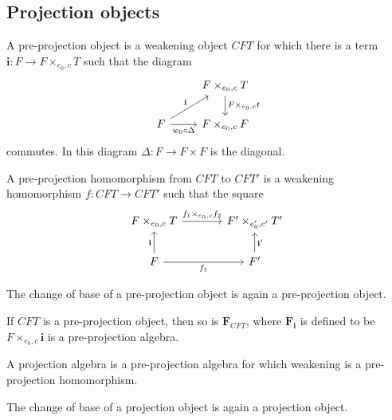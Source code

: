 \subsection{Projection objects}
\begin{defn}
A pre-projection object is a weakening object $CFT$ for which there is a term
$\mathbf{i}:F\to F\times_{e_0,c}T$ such that the diagram
\begin{equation*}
\begin{tikzcd}
{} & F\times_{e_0,c}T \ar{d}{F\times_{e_0,c}t}\\
F \ar{ur}{\mathbf{i}} \ar{r}[swap]{w_0\circ\Delta} & F\times_{e_0,c}F
\end{tikzcd}
\end{equation*}
commutes. In this diagram $\Delta:F\to F\times F$ is the diagonal.
\end{defn}

\begin{defn}
A pre-projection homomorphism from $CFT$ to $CFT'$ is a weakening homomorphism
$f:CFT\to CFT'$ such that the square
\begin{equation*}
\begin{tikzcd}[column sep=large]
F\times_{e_0,c}T
  \ar{r}{f_1\times_{e_0,c}f_2}
  &
F'\times_{e_0',c'}T'
  \\
F \ar{r}[swap]{f_1}
  \ar{u}{\mathbf{i}}
  &
F'
  \ar{u}[swap]{\mathbf{i}'}
\end{tikzcd}
\end{equation*}
\end{defn}

\begin{lem}
The change of base of a pre-projection object is again a pre-projection object.
\end{lem}

\begin{lem}
If $CFT$ is a pre-projection object, then so is $\mathbf{F}_{CFT}$, where
$\mathbf{F}_{\mathbf{i}}$ is defined to be $F\times_{e_0,c}\mathbf{i}$ is
a pre-projection algebra.
\end{lem}

\begin{defn}
A projection algebra is a pre-projection algebra for which weakening is a
pre-projection homomorphism.
\end{defn}

\begin{cor}
The change of base of a projection object is again a projection object.
\end{cor}

